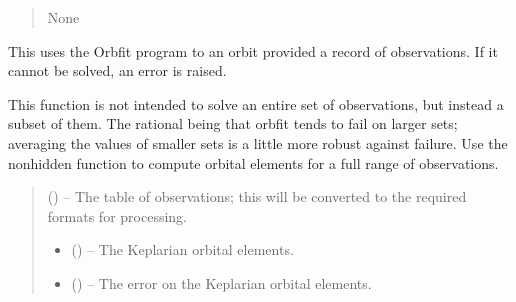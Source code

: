 \documentclass[letterpaper,11pt,english]{sphinxmanual}
\begin{document}
\begin{savenotes}
\begin{fulllineitems}
\begin{savenotes}
\begin{fulllineitems}
\begin{quote}
\begin{description}
\sphinxAtStartPar
None

\end{description}\end{quote}

\end{fulllineitems}\end{savenotes}


\begin{savenotes}\begin{fulllineitems}
\label{\detokenize{code/opihiexarata.orbit.orbfit:opihiexarata.orbit.orbfit.OrbfitOrbitDeterminerEngine._solve_single_orbit}}
\pysigstartsignatures
{}
\pysigstopsignatures
\sphinxAtStartPar
This uses the Orbfit program to an orbit provided a record of
observations. If it cannot be solved, an error is raised.

\sphinxAtStartPar
This function is not intended to solve an entire set of observations,
but instead a subset of them. The rational being that orbfit tends to
fail on larger sets; averaging the values of smaller sets is a little
more robust against failure. Use the non\sphinxhyphen{}hidden function to compute
orbital elements for a full range of observations.
\begin{quote}\begin{description}
\sphinxAtStartPar
{} () – The table of observations; this will be converted to the
required formats for processing.

\sphinxAtStartPar
\begin{itemize}
\item {} 
\sphinxAtStartPar
{} () – The Keplarian orbital elements.

\item {} 
\sphinxAtStartPar
{} () – The error on the Keplarian orbital elements.


\end{itemize}
\end{description}
\end{quote}
\end{fulllineitems}
\end{savenotes}
\end{fulllineitems}
\end{savenotes}
\end{document}

